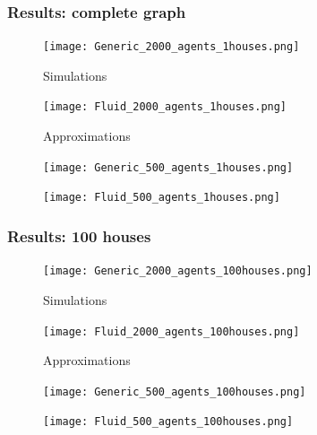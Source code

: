 \documentclass{beamer}
\begin{document}
	\begin{frame}
	\frametitle{Results: complete graph}
	
	\begin{figure}
		\centering
		\begin{minipage}{0.45\textwidth}
			\centering
			\texttt{[image: Generic\_2000\_agents\_1houses.png]} %
			\caption*{Simulations}
		\end{minipage}\hfill
		\begin{minipage}{0.45\textwidth}
			\centering
			\texttt{[image: Fluid\_2000\_agents\_1houses.png]} %
			\caption*{Approximations}
		\end{minipage}
	\end{figure}
	
	
	
	\begin{figure}
		\centering
		\begin{minipage}{0.45\textwidth}
			\centering
			\texttt{[image: Generic\_500\_agents\_1houses.png]} %
			\caption*{}
		\end{minipage}\hfill
		\begin{minipage}{0.45\textwidth}
			\centering
			\texttt{[image: Fluid\_500\_agents\_1houses.png]} %
			\caption*{}
		\end{minipage}
	\end{figure}
	
	
	\end{frame}

	\begin{frame}
\frametitle{Results: 100 houses}

\begin{figure}
	\centering
	\begin{minipage}{0.45\textwidth}
		\centering
		\texttt{[image: Generic\_2000\_agents\_100houses.png]} %
		\caption*{Simulations}
	\end{minipage}\hfill
	\begin{minipage}{0.45\textwidth}
		\centering
		\texttt{[image: Fluid\_2000\_agents\_100houses.png]} %
		\caption*{Approximations}
	\end{minipage}
\end{figure}



\begin{figure}
	\centering
	\begin{minipage}{0.45\textwidth}
		\centering
		\texttt{[image: Generic\_500\_agents\_100houses.png]} %
		\caption*{}
	\end{minipage}\hfill
	\begin{minipage}{0.45\textwidth}
		\centering
		\texttt{[image: Fluid\_500\_agents\_100houses.png]} %
		\caption*{}
	\end{minipage}
\end{figure}


\end{frame}
\end{document}
